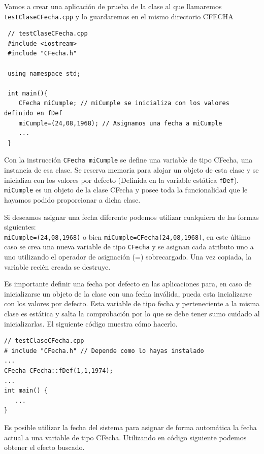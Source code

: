 \documentclass[10pt,a4paper]{article}
\begin{document}
Vamos a crear una aplicaci\'on de prueba de la clase al que llamaremos \texttt{testClaseCFecha.cpp} y lo guardaremos en el mismo directorio CFECHA

 \color{orange}
 \begin{verbatim}
 // testClaseCFecha.cpp
 #include <iostream>
 #include "CFecha.h"
 
 using namespace std;
 
 int main(){
    CFecha miCumple; // miCumple se inicializa con los valores definido en fDef
    miCumple=(24,08,1968); // Asignamos una fecha a miCumple
    ...
 } 
 \end{verbatim}
 \color{black}

Con la instrucci\'on \texttt{CFecha miCumple} se define una variable de tipo CFecha, una instancia de esa clase. Se reserva memoria para alojar un objeto de esta clase y se inicializa con los valores por defecto (Definida en la variable est\'atica \texttt{fDef}).  \texttt{miCumple} es un objeto de la clase CFecha y posee toda la funcionalidad que le hayamos podido proporcionar a dicha clase.

Si deseamos asignar una fecha diferente podemos utilizar cualquiera de las formas siguientes: \\ \texttt{miCumple=(24,08,1968)} o bien \texttt{miCumple=CFecha(24,08,1968)}, en este \'ultimo caso se crea una nueva variable de tipo \texttt{CFecha} y se asignan cada atributo uno a uno utilizando el operador de asignaci\'on (=) sobrecargado. Una vez copiada, la variable reci\'en creada se destruye.

Es importante definir una fecha por defecto en las aplicaciones para, en caso de inicializarse un objeto de la clase con una fecha inv\'alida, pueda esta incializarse con los valores por defecto. Esta variable de tipo fecha y perteneciente a la misma clase es est\'atica y salta la comprobaci\'on por lo que se debe tener sumo cuidado al inicializarlas. El siguiente c\'odigo muestra c\'omo hacerlo.

\color{orange}
\begin{verbatim}
// testClaseCFecha.cpp
# include "CFecha.h" // Depende como lo hayas instalado
...
CFecha CFecha::fDef(1,1,1974);
...
int main() {
   ...
}
\end{verbatim}
\color{black}



Es posible utilizar la fecha del sistema para asignar de forma autom\'atica la fecha actual a una variable de tipo CFecha. Utilizando en c\'odigo siguiente podemos obtener el efecto buscado.
\end{document}
